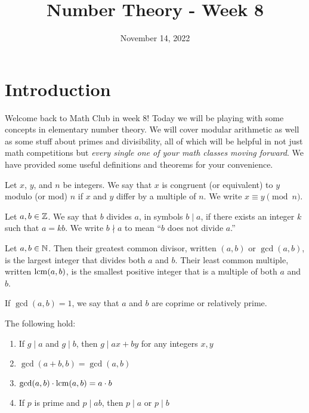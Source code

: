 \documentclass{article}
\title{Number Theory - Week 8}
\author{}
\date{November 14, 2022}
\begin{document}
\section{Introduction}

    Welcome back to Math Club in week 8! 
    Today we will be playing with some concepts in elementary number theory. 
    We will cover modular arithmetic as well as some stuff about primes and divisibility, all of which will be helpful in not just math competitions but \textit{every single one of your math classes moving forward}. 
    We have provided some useful definitions and theorems for your convenience.

    \begin{definition}
        Let \(x\), \(y\), and \(n\) be integers. 
        We say that \(x\) is congruent (or equivalent) to \(y\) modulo (or mod) \(n\) if \(x\) and \(y\) differ by a multiple of \(n\). 
        We write \(x\equiv y\pmod{n}\).
    \end{definition}

    \begin{definition}
        Let \(a,b\in\mathbb{Z}\). 
        We say that $b$ divides $a$, in symbols $b \mid a$, if there exists an integer $k$ such that $a=kb$. We write $b\nmid a$ to mean ``$b$ does not divide $a$.''
    \end{definition}

    \begin{definition}
        Let \(a,b\in\mathbb{N}\). 
        Then their greatest common divisor, written \((a,b)\) or \(\gcd(a,b)\), is the largest integer that divides both \(a\) and \(b\). 
        Their least common multiple, written \(\operatorname{lcm}(a,b)\), is the smallest positive integer that is a multiple of both \(a\) and \(b\).

        If \(\gcd(a,b)=1\), we say that \(a\) and \(b\) are coprime or relatively prime.
    \end{definition}
    
    \begin{theorem}
        The following hold:
        \begin{enumerate}
            \item If \(g\mid a\) and \(g\mid b\), then \(g\mid ax+by\) for any integers \(x,y\)
            \item \(\gcd(a+b,b)=\gcd(a,b)\)
            \item \(\gcd(a,b)\cdot\operatorname{lcm}(a,b)=a\cdot b\)
            \item If \(p\) is prime and \(p\mid ab\), then \(p\mid a\) or \(p\mid b\)
        \end{enumerate}
    \end{theorem}
    
\end{document}
